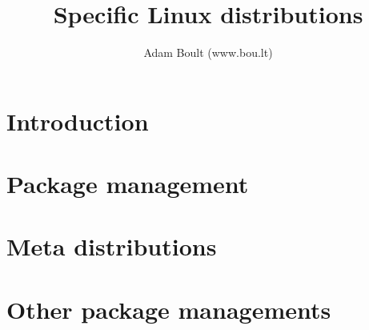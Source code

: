 \documentclass[oneside]{book}
\begin{document}
\author{Adam Boult (www.bou.lt)}
\title{Specific Linux distributions}
\maketitle

\setcounter{tocdepth}{0}
\tableofcontents



\part{Introduction}


\part{Package management}











\part{Meta distributions}


\part{Other package managements}


\end{document}
